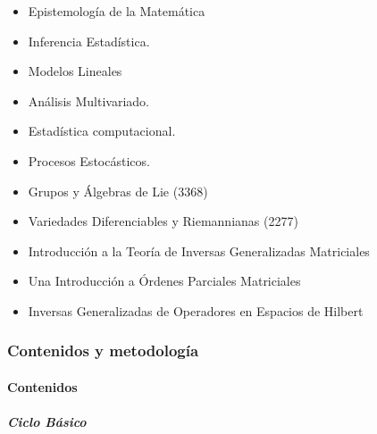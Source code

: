 \documentclass[a4paper, 12pt]{article}
\begin{document}
\begin{itemize}
\item {Epistemología de la Matemática} 







\item  {Inferencia Estadística}. 

 
 


\item  {Modelos Lineales} 
 
 
\item  {Análisis Multivariado}. 
  





\item  {Estadística computacional}.  



\item  {Procesos Estocásticos}. 

  

\item { Grupos y Álgebras de Lie (3368)} 
\item { Variedades Diferenciables y Riemannianas  (2277)} 


\item { Introducción a la Teoría de Inversas Generalizadas Matriciales}  

\item {Una Introducción a Órdenes Parciales Matriciales} 

\item { Inversas Generalizadas de Operadores en Espacios de Hilbert } 
\end{itemize}




\subsubsection{Contenidos y metodología}
\paragraph{Contenidos}
\subparagraph{Ciclo Básico}
\end{document}
